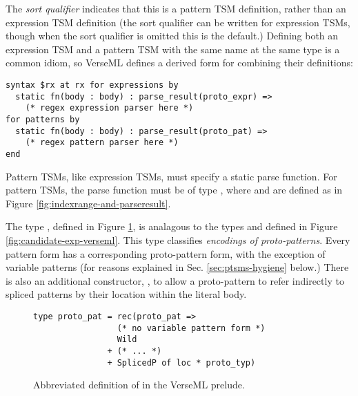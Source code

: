 {The \emph{sort qualifier}  indicates that this is a pattern TSM definition, rather than an expression TSM definition (the sort qualifier  can be written for expression TSMs, though when the sort qualifier is omitted this is the default.) Defining both an expression TSM and a pattern TSM with the same name at the same type is a common idiom, so VerseML defines a derived form for combining their definitions:
\begin{lstlisting}[numbers=none,morekeywords={andfor}]
syntax $rx at rx for expressions by
  static fn(body : body) : parse_result(proto_expr) => 
    (* regex expression parser here *)
for patterns by 
  static fn(body : body) : parse_result(proto_pat) => 
    (* regex pattern parser here *)
end
\end{lstlisting}

Pattern TSMs, like expression TSMs, must specify a static {parse function}. For pattern TSMs, the parse function must be of type , where  and  are defined as in Figure \ref{fig:indexrange-and-parseresult}. 

The type , defined in Figure \ref{fig:CEPat}, is analagous to the types  and  defined in Figure \ref{fig:candidate-exp-verseml}. This type classifies \emph{encodings of proto-patterns}. Every pattern form has a corresponding proto-pattern form, with the exception of variable patterns (for reasons explained in Sec. \ref{sec:ptsms-hygiene} below.) There is also an additional constructor, , to allow a proto-pattern to refer indirectly to spliced patterns by their location within the literal body.

\begin{figure}
\begin{lstlisting}[numbers=none]
type proto_pat = rec(proto_pat => 
                 (* no variable pattern form *) 
                 Wild
               + (* ... *)
               + SplicedP of loc * proto_typ)
\end{lstlisting}
\caption[Abbreviated definition of  in VerseML]{Abbreviated definition of  in the VerseML prelude.}
\label{fig:CEPat}
\end{figure}

}
